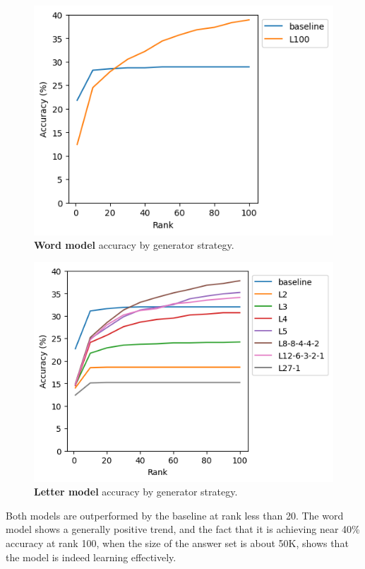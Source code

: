 \documentclass[letterpaper]{article} %
\begin{document}
\begin{NoHyper}
\begin{figure}
\centering
\includegraphics[width=0.95\columnwidth]{fig-onemark-acc-by-strat}
\caption{\textbf{Word model} accuracy by generator strategy.}
\label{fig:onemark-acc-by-strat}
\end{figure}

\begin{figure}
\centering
\includegraphics[width=0.95\columnwidth]{fig-charmark-accuracy-default-tmp}
\caption{\textbf{Letter model} accuracy by generator strategy.}
\label{fig:charmark-acc-by-strat}
\end{figure}

Both models are outperformed by the baseline at rank less than 20.
The word model shows a generally positive trend, and the fact that it is achieving near 40\% accuracy at rank 100, when the size of the answer set is about 50K, shows that the model is indeed learning effectively.


\end{NoHyper}
\end{document}
